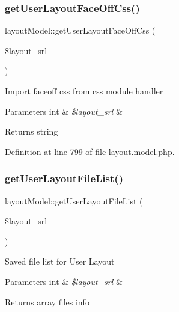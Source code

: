 \mbox{\label{classlayoutModel_a82cac2109b93170e8f573576de2eb0d0}} 
\subsubsection{\texorpdfstring{get\+User\+Layout\+Face\+Off\+Css()}{getUserLayoutFaceOffCss()}}
{\footnotesize\ttfamily layout\+Model\+::get\+User\+Layout\+Face\+Off\+Css (\begin{DoxyParamCaption}\item[{}]{\$layout\+\_\+srl }\end{DoxyParamCaption})}

Import faceoff css from css module handler 
\begin{DoxyParams}[1]{Parameters}
int & {\em \$layout\+\_\+srl} & \\
\hline
\end{DoxyParams}
\begin{DoxyReturn}{Returns}
string 
\end{DoxyReturn}


Definition at line 799 of file layout.\+model.\+php.

\mbox{\label{classlayoutModel_a068c761aeebdbc423b005a2e793b1b21}} 
\subsubsection{\texorpdfstring{get\+User\+Layout\+File\+List()}{getUserLayoutFileList()}}
{\footnotesize\ttfamily layout\+Model\+::get\+User\+Layout\+File\+List (\begin{DoxyParamCaption}\item[{}]{\$layout\+\_\+srl }\end{DoxyParamCaption})}

Saved file list for User Layout 
\begin{DoxyParams}[1]{Parameters}
int & {\em \$layout\+\_\+srl} & \\
\hline
\end{DoxyParams}
\begin{DoxyReturn}{Returns}
array files info 
\end{DoxyReturn}


